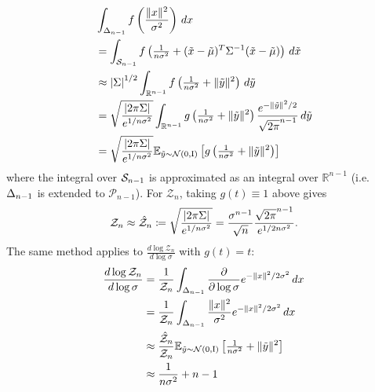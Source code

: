 \begin{align*}
     & \int_{\Delta_{n-1}} f\left( \frac{\lVert x \rVert^2}{\sigma^2} \right) \, dx                                                                                                                                                       \\
     & = \int_{\mathcal{S}_{n-1}} f\left( \tfrac{1}{n \sigma^2} + (\tilde{x} - \tilde{\mu})^T \Sigma^{-1} (\tilde{x} - \tilde{\mu}) \right) \, d\tilde{x}                                                                   \\
     & \approx \left\lvert\Sigma\right\rvert^{1/2}  \int_{\mathbb{R}^{n-1}} f\left( \tfrac{1}{n \sigma^2} + \lVert \tilde{y} \rVert^2 \right) \, d\tilde{y}                                                                                             \\
     & = \sqrt{\frac{\left\lvert2\pi \Sigma\right\rvert}{e^{1 / n \sigma^2}}} \int_{\mathbb{R}^{n-1}} g\left( \tfrac{1}{n \sigma^2} + \lVert \tilde{y} \rVert^2 \right) \frac{e^{-\lVert \tilde{y} \rVert^2 / 2}}{\sqrt{2\pi}^{n-1}} \, d\tilde{y} \\
     & = \sqrt{\frac{\left\lvert2\pi \Sigma\right\rvert}{e^{1 / n \sigma^2}}} \mathbb{E}_{\tilde{y} \sim \mathcal{N}(\mathrm{0}, \mathrm{I})} \left[ g \left( \tfrac{1}{n \sigma^2} + \lVert \tilde{y} \rVert^2 \right) \right]
\end{align*}
where the integral over $\mathcal{S}_{n-1}$ is approximated as an integral over $\mathbb{R}^{n-1}$ (i.e.\ $\Delta_{n-1}$ is extended to $\mathcal{P}_{n-1}$).
For $\mathcal{Z}_n$, taking $g(t) \equiv 1$ above gives
\begin{align*}
    \mathcal{Z}_n \approx \hat{\mathcal{Z}}_n
    \coloneqq \sqrt{\frac{\left\lvert2\pi \Sigma\right\rvert}{e^{1 / n \sigma^2}}}
    = \frac{\sigma^{n-1}}{\sqrt{n}} \frac{\sqrt{2\pi}^{n-1}}{e^{1 / 2 n \sigma^2}}.
\end{align*}
The same method applies to $\frac{d \log\mathcal{Z}_n}{d \log\sigma}$ with $g(t) = t$:
\begin{align*}
    \frac{d \log\mathcal{Z}_n}{d \log\sigma} & = \frac{1}{\mathcal{Z}_n} \int_{\Delta_{n-1}} \frac{\partial}{\partial \log\sigma} e^{ -\lVert x \rVert^2 / 2 \sigma^2 } \, dx                                    \\
                                             & = \frac{1}{\mathcal{Z}_n} \int_{\Delta_{n-1}} \frac{\lVert x \rVert^2}{\sigma^2} e^{ -\lVert x \rVert^2 / 2 \sigma^2 } \, dx                                 \\
                                             & \approx \frac{\hat{\mathcal{Z}}_n}{\mathcal{Z}_n} \mathbb{E}_{\tilde{y} \sim \mathcal{N}(\mathrm{0}, \mathrm{I})} \left[ \tfrac{1}{n \sigma^2} + \lVert \tilde{y} \rVert^2 \right] \\
                                             & \approx \frac{1}{n \sigma^2} + n - 1
\end{align*}
